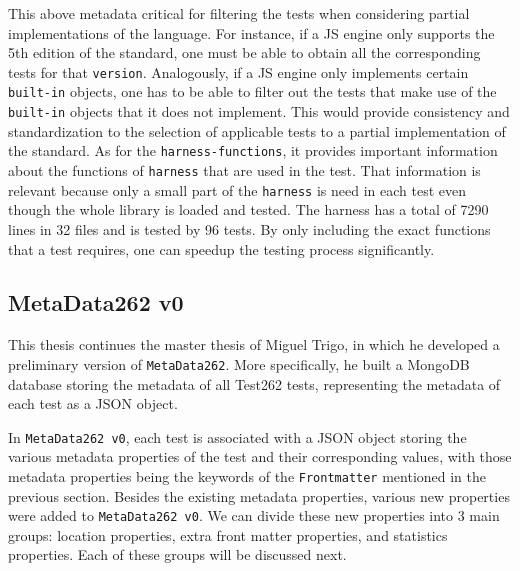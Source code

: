 \documentclass[runningheads]{llncs}
\begin{document}
This above metadata critical for filtering the tests when considering partial implementations of the language. For instance, if a JS engine only supports the 5th edition of the standard, one must be able to obtain all the corresponding tests for that \texttt{version}. Analogously, if a JS engine only implements certain \texttt{built-in} objects, one has to be able to filter out the tests that make use of the \texttt{built-in} objects that it does not implement. This would provide consistency and standardization to the selection of applicable tests to a partial implementation of the standard.
%
As for the \texttt{harness-functions}, it provides important information about the functions of \texttt{harness} that are used in the test. That information is relevant because only a small part of the \texttt{harness} is need in each test even though the whole library is loaded and tested. The harness has a total of 7290 lines in 32 files and is tested by 96 tests. By only including the exact functions that a test requires, one can speedup the testing process significantly.



\subsection{MetaData262 v0}
\label{subsec:MetaData262 v0}



This thesis continues the master thesis of Miguel Trigo\cite{MetaDataV0}, in which he developed a preliminary version of \texttt{MetaData262}. More specifically, he built a MongoDB database storing the metadata of all Test262 tests, representing the metadata of each test as a JSON object.



In \texttt{MetaData262 v0}, each test is associated with a JSON object storing the various metadata properties of the test and their corresponding values, with those metadata properties being the keywords of the \texttt{Frontmatter} mentioned in the previous section.
%
Besides the existing metadata properties, various new properties were added to \texttt{MetaData262 v0}. We can divide these new properties into 3 main groups: location properties, extra front matter properties, and statistics properties. Each of these groups will be discussed next.
\end{document}
